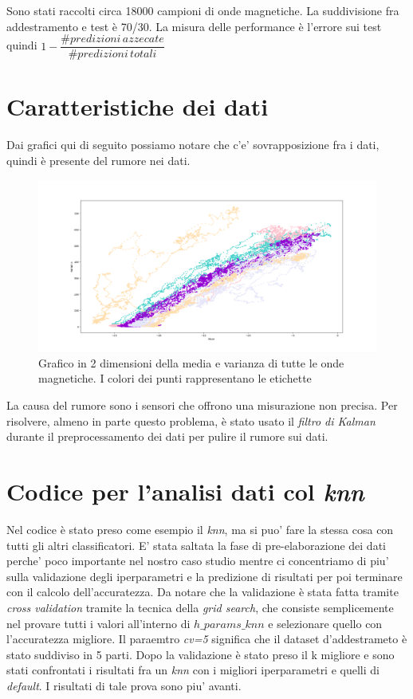 Sono stati raccolti circa 18000 campioni di onde magnetiche. La suddivisione fra addestramento e test \`e 70/30. La misura delle performance \`e l'errore sui test quindi  $1 - \dfrac{\# predizioni\, azzecate}{\# predizioni\,totali}$

\section{Caratteristiche dei dati}
Dai grafici qui di seguito possiamo notare che c'e' sovrapposizione fra i dati, quindi \`e presente del rumore nei dati.
\begin{figure}[H]
	\centering
	\includegraphics[width=1\linewidth]{img/plot_features}
	\caption{Grafico in 2 dimensioni della media e varianza di tutte le onde magnetiche. I colori dei punti rappresentano le etichette}
	\label{fig:plotfeatures}
\end{figure}

La causa del rumore sono i sensori che offrono una misurazione non precisa. Per risolvere, almeno in parte questo problema, \`e stato usato il \textit{filtro di Kalman} durante il preprocessamento dei dati per pulire il rumore sui dati.

\section{Codice per l'analisi dati col \textit{knn}}

Nel codice \`e stato preso come esempio il \textit{knn}, ma si puo' fare la stessa cosa con tutti gli altri classificatori. E' stata saltata la fase di pre-elaborazione dei dati perche' poco importante nel nostro caso studio mentre ci concentriamo di piu' sulla validazione degli iperparametri e la predizione di risultati per poi terminare con il calcolo dell'accuratezza. Da notare che la validazione \`e stata fatta tramite \textit{cross validation} tramite la tecnica della \textit{grid search}, che consiste semplicemente nel provare tutti i valori all'interno di \textit{$h\_params\_knn$} e selezionare quello con l'accuratezza migliore. Il paraemtro \textit{cv=5} significa che il dataset d'addestrameto \`e stato suddiviso in 5 parti. Dopo la validazione \`e stato preso il k migliore e sono stati confrontati i risultati fra un \textit{knn} con i migliori iperparametri e quelli di \textit{default}. I risultati di tale prova sono piu' avanti.


